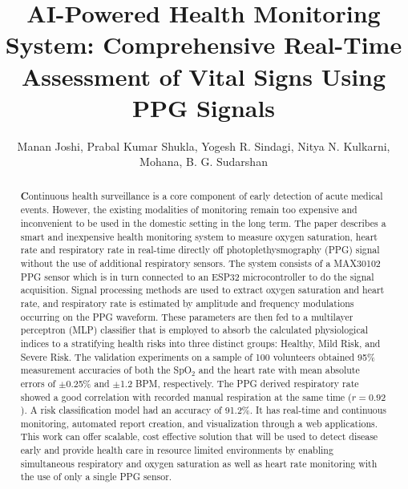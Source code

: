 \documentclass{ieeeaccess}
\begin{document}
\title{AI-Powered Health Monitoring System: Comprehensive Real-Time Assessment of Vital Signs Using PPG Signals}

\author{
Manan Joshi,
Prabal Kumar Shukla,
Yogesh R. Sindagi,
Nitya N. Kulkarni,
Mohana,
B. G. Sudarshan
}

\address[1]{Department of Computer Science and Engineering, R.V. College of Engineering, Bangalore, India}
\address[2]{Department of Computer Science and Engineering, R.V. College of Engineering, Bangalore, India}
\address[3]{Department of Computer Science and Engineering, R.V. College of Engineering, Bangalore, India}
\address[4]{Department of Computer Science and Engineering, R.V. College of Engineering, Bangalore, India}
\address[5]{Department of Computer Science and Engineering, R.V. College of Engineering, Bangalore, India}
\address[6]{Department of Electronics and Instrumentation Engineering, R.V. College of Engineering, Bangalore, India}


\begin{abstract}
\textbf Continuous health surveillance is a core component of early detection of acute medical events. However, the existing modalities of monitoring remain too expensive and inconvenient to be used in the domestic setting in the long term. The paper describes a smart and inexpensive health monitoring system to measure oxygen saturation, heart rate and respiratory rate in real-time directly off photoplethysmography (PPG) signal without the use of additional respiratory sensors. The system consists of a MAX30102 PPG sensor which is in turn connected to an ESP32 microcontroller to do the signal acquisition. Signal processing methods are used to extract oxygen saturation and heart rate, and respiratory rate is estimated by amplitude and frequency modulations occurring on the PPG waveform. These parameters are then fed to a multilayer perceptron (MLP) classifier that is employed to absorb the calculated physiological indices to a stratifying health risks into three distinct groups: Healthy, Mild Risk, and Severe Risk. The validation experiments on a sample of 100 volunteers obtained 95\% measurement accuracies of both the SpO$_2$ and the heart rate with mean absolute errors of $\pm$0.25\% and $\pm$1.2 BPM, respectively. The PPG derived respiratory rate showed a good correlation with recorded manual respiration at the same time ($r = 0.92$). A risk classification model had an accuracy of 91.2\%. It has real-time and continuous monitoring, automated report creation, and visualization through a web applications. This work can offer scalable, cost effective solution that will be used to detect disease early and provide health care in resource limited environments by enabling simultaneous respiratory and oxygen saturation as well as heart rate monitoring with the use of only a single PPG sensor.

\end{abstract}
\end{document}
